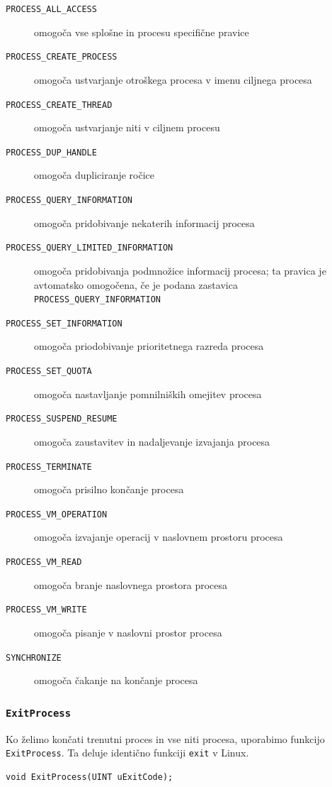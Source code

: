 \documentclass[a4paper,12pt,openright]{book}
\begin{document}
\begin{description}
	\item[\texttt{PROCESS\_ALL\_ACCESS}] omogoča vse splošne in procesu specifične pravice
	\item[\texttt{PROCESS\_CREATE\_PROCESS}] omogoča ustvarjanje otroškega procesa v imenu ciljnega procesa
	\item[\texttt{PROCESS\_CREATE\_THREAD}] omogoča ustvarjanje niti v ciljnem procesu
	\item[\texttt{PROCESS\_DUP\_HANDLE}] omogoča dupliciranje ročice
	\item[\texttt{PROCESS\_QUERY\_INFORMATION}] omogoča pridobivanje nekaterih informacij procesa
	\item[\texttt{PROCESS\_QUERY\_LIMITED\_INFORMATION}] omogoča pridobivanja podmnožice informacij procesa; ta pravica je avtomatsko omogočena, če je podana zastavica \texttt{PROCESS\_QUERY\_INFORMATION}
	\item[\texttt{PROCESS\_SET\_INFORMATION}] omogoča priodobivanje prioritetnega razreda procesa
	\item[\texttt{PROCESS\_SET\_QUOTA}] omogoča nastavljanje pomnilniških omejitev procesa
	\item[\texttt{PROCESS\_SUSPEND\_RESUME}] omogoča zaustavitev in nadaljevanje izvajanja procesa
	\item[\texttt{PROCESS\_TERMINATE}] omogoča prisilno končanje procesa
	\item[\texttt{PROCESS\_VM\_OPERATION}] omogoča izvajanje operacij v naslovnem prostoru procesa
	\item[\texttt{PROCESS\_VM\_READ}] omogoča branje naslovnega prostora procesa
	\item[\texttt{PROCESS\_VM\_WRITE}] omogoča pisanje v naslovni prostor procesa
	\item[\texttt{SYNCHRONIZE}] omogoča čakanje na končanje procesa
\end{description}

\subsubsection{\texttt{ExitProcess}}

Ko želimo končati trenutni proces in vse niti procesa, uporabimo funkcijo \texttt{ExitProcess}.
Ta deluje identično funkciji \texttt{exit} v Linux.

\begin{lstlisting}[style=func]
 void ExitProcess(UINT uExitCode);
\end{lstlisting}
\end{document}
